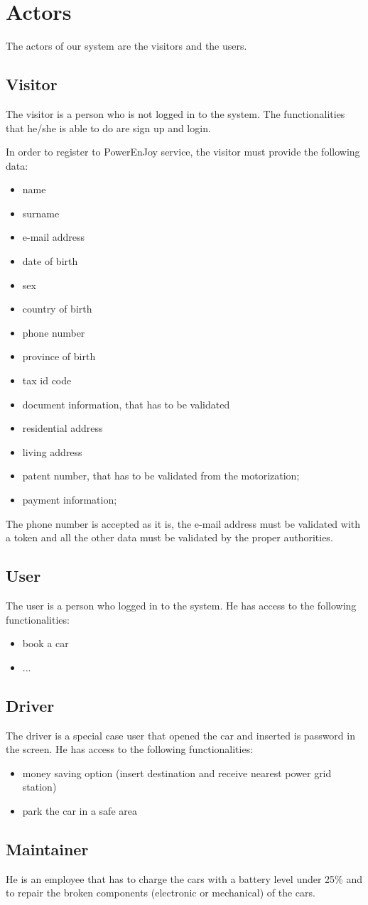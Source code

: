 \section{Actors}
The actors of our system are the visitors and the users.

\subsection{Visitor}
The visitor is a person who is not logged in to the system. The functionalities that he/she is able to do are sign up and login.

In order to register to PowerEnJoy service, the visitor must provide the following data:
\begin{itemize}
	\item name
	\item surname
	\item e-mail address
	\item date of birth
	\item sex
	\item country of birth
	\item phone number
	\item province of birth
	\item tax id code %
	\item document information, that has to be validated
	\item residential address
	\item living address
	\item patent number, that has to be validated from the motorization;
	\item payment information;
\end{itemize}

The phone number is accepted as it is, the e-mail address must be validated with a token and all
the other data must be validated by the proper authorities.

\subsection{User}
The user is a person who logged in to the system. He has access to the following functionalities:
\begin{itemize}
	\item book a car
	\item ...
\end{itemize}

\subsection{Driver}
The driver is a special case user that opened the car and inserted is password in the screen. He has access to the following functionalities:
\begin{itemize}
	\item money saving option (insert destination and receive nearest power grid station)
	\item park the car in a safe area
\end{itemize}

\subsection{Maintainer}
He is an employee that has to charge the cars with a battery level under 25\% and to repair the broken components (electronic or mechanical) of the cars.